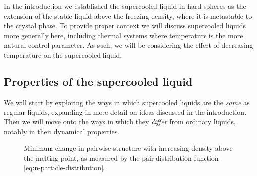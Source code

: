 
In the introduction we established the supercooled liquid in hard spheres as the extension of the stable liquid above the freezing density, where it is metastable to the crystal phase.
To provide proper context we will discuss supercooled liquids more generally here, including thermal systems where temperature is the more natural control parameter.
As such, we will be considering the effect of decreasing temperature on the supercooled liquid.

\subsection{Properties of the supercooled liquid}

We will start by exploring the ways in which supercooled liquids are the \emph{same} as regular liquids, expanding in more detail on ideas discussed in the introduction.
Then we will move onto the ways in which they \emph{differ} from ordinary liquids, notably in their dynamical properties.

\begin{SCfigure}
  \caption{Minimum change in pairwise structure with increasing density above the melting point, as measured by the pair distribution function \eqref{eq:n-particle-distribution}.}
  \label{fig:g2-changes}
\end{SCfigure}


